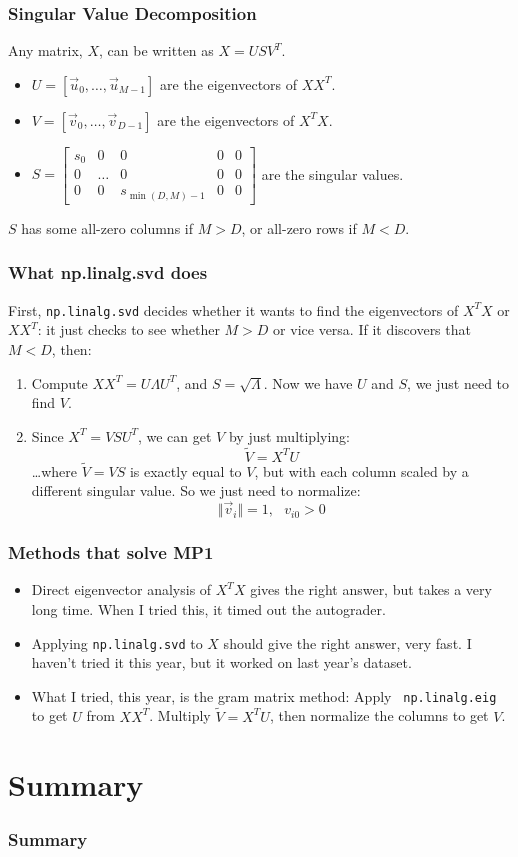 \documentclass{beamer}
\begin{document}
\begin{frame}
  \frametitle{Singular Value Decomposition}
  Any matrix, $X$, can be written as $X=USV^T$.
  \begin{itemize}
  \item $U=[\vec{u}_0,\ldots,\vec{u}_{M-1}]$ are the eigenvectors of $XX^T$.
  \item $V=[\vec{v}_0,\ldots,\vec{v}_{D-1}]$ are the eigenvectors of $X^TX$.
  \item $S=\left[\begin{array}{ccccc}s_0&0&0&0&0\\0&\ldots&0&0&0\\0&0&s_{\min(D,M)-1}&0&0\end{array}\right]$ are the singular values.
  \end{itemize}
  $S$ has some all-zero columns if $M>D$, or all-zero rows if $M<D$.
\end{frame}

\begin{frame}
  \frametitle{What np.linalg.svd does}
  First, {\tt np.linalg.svd} decides whether it wants to find the eigenvectors of
  $X^TX$ or $XX^T$: it just checks to see whether $M>D$ or vice versa.
  If it discovers that $M<D$, then:
  \begin{enumerate}
  \item Compute  $XX^T=U\Lambda U^T$, and $S=\sqrt{\Lambda}$.
    Now we have $U$ and $S$, we just need to  find $V$.
  \item Since $X^T=VSU^T$, we can get $V$ by just multiplying:
    \[
    \tilde{V} = X^TU
    \]
    \ldots where $\tilde{V}=VS$ is exactly equal to $V$, but with each column
    scaled by a different singular value.  So we just need to normalize:
    \[
    \Vert\vec{v}_i\Vert=1,~~~v_{i0}>0
    \]
  \end{enumerate}
\end{frame}

\begin{frame}
  \frametitle{Methods that solve MP1}
  \begin{itemize}
  \item Direct eigenvector analysis of $X^TX$ gives the right answer, but
    takes a very long time. When I tried this, it timed out the autograder.
  \item Applying {\tt np.linalg.svd} to $X$ should give the right answer, very fast.
    I haven't tried it this year, but it worked on last year's dataset.
  \item What I tried, this year, is the gram matrix method: Apply {\tt
    np.linalg.eig} to get $U$ from $XX^T$. Multiply $\tilde{V}=X^TU$,
    then normalize the columns to get $V$.
  \end{itemize}
\end{frame}

\section{Summary}
\setcounter{subsection}{1}

\begin{frame}
  \frametitle{Summary}
\end{frame}
\end{document}
